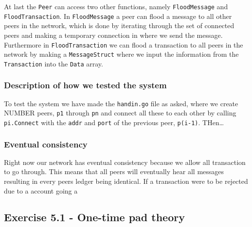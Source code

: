 \documentclass[
  paper=a4,
  ,captions=tableheading
]{scrartcl}
\newcommand{\passthrough}[1]{#1}
\begin{document}
At last the \passthrough{\lstinline!Peer!} can access two other
functions, namely \passthrough{\lstinline!FloodMessage!} and
\passthrough{\lstinline!FloodTransaction!}. In
\passthrough{\lstinline!FloodMessage!} a peer can flood a message to all
other peers in the network, which is done by iterating through the set
of connected peers and making a temporary connection in where we send
the message. Furthermore in \passthrough{\lstinline!FloodTransaction!}
we can flood a transaction to all peers in the network by making a
\passthrough{\lstinline!MessageStruct!} where we input the information
from the \passthrough{\lstinline!Transaction!} into the
\passthrough{\lstinline!Data!} array.

\hypertarget{description-of-how-we-tested-the-system}{%
\subsubsection{\texorpdfstring{\textbf{Description of how we tested the
system}}{Description of how we tested the system}}\label{description-of-how-we-tested-the-system}}

To test the system we have made the \passthrough{\lstinline!handin.go!}
file as asked, where we create NUMBER peers,
\passthrough{\lstinline!p1!} through \passthrough{\lstinline!pn!} and
connect all these to each other by calling
\passthrough{\lstinline!pi.Connect!} with the
\passthrough{\lstinline!addr!} and \passthrough{\lstinline!port!} of the
previous peer, \passthrough{\lstinline!p(i-1)!}. THen\ldots{}

\hypertarget{eventual-consistency}{%
\subsubsection{\texorpdfstring{\textbf{Eventual
consistency}}{Eventual consistency}}\label{eventual-consistency}}

Right now our network has eventual consistency because we allow all
transaction to go through. This means that all peers will eventually
hear all messages resulting in every peers ledger being identical. If a
transaction were to be rejected due to a account going a

\hypertarget{exercise-5.1---one-time-pad-theory}{%
\subsection{Exercise 5.1 - One-time pad
theory}\label{exercise-5.1---one-time-pad-theory}}
\end{document}
